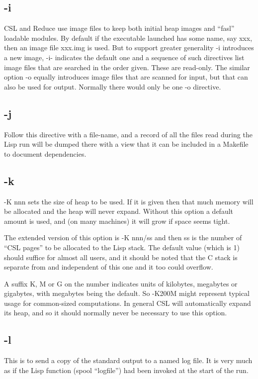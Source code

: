 \documentclass[a4paper,11pt]{article}
\begin{document}
\subsection{\ttfamily -i}
   CSL and Reduce use image files to keep both initial heap images and
   ``fasl'' loadable modules. By default if the executable launched has some name,
   say xxx, then an image file xxx.img is used. But to support greater
   generality {\ttfamily -i} introduces a new image, {\ttfamily -i-} indicates
   the default one and a sequence of such directives list image files that are
   searched in the order given. These are read-only. The similar option
   {\ttfamily -o} equally introduces image files that are scanned for input, but
   that can also be used for output. Normally there would only be one
   {\ttfamily -o} directive.

\subsection{\ttfamily -j}
   Follow this directive with a file-name, and a record of all the files read
   during the Lisp run will be dumped there with a view that it can be included
   in a Makefile to document dependencies.

\subsection{\ttfamily -k}
   {\ttfamily -K nnn} sets the size of heap to be used.  If it is given then that much
   memory will be allocated and the heap will never expand.  Without this
   option a default amount is used, and (on many machines) it will grow
   if space seems tight.
  
   The extended version of this option is {\ttfamily -K nnn/ss} and then ss is the
   number of ``CSL pages'' to be allocated to the Lisp stack. The default
   value (which is 1) should suffice for almost all users, and it should
   be noted that the C stack is separate from and independent of this one and
   it too could overflow.
  
   A suffix K, M or G on the number indicates units of kilobytes, megabytes or
   gigabytes, with megabytes being the default. So {\ttfamily -K200M} might
   represent typical usage for common-sized computations. In general CSL
   will automatically expand its heap, and so it should normally never be
   necessary to use this option.

\subsection{\ttfamily -l}
   This is to send a copy of the standard output to a named log file. It is
   very much as if the Lisp function {\ttfamily (spool ``logfile'')} had been
   invoked at the start of the run.
\end{document}
